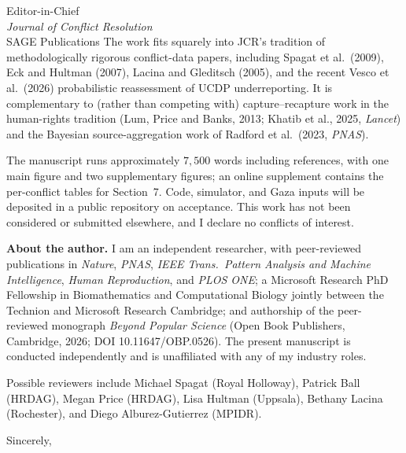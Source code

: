 \documentclass[11pt]{letter}
\begin{document}
\begin{letter}{Editor-in-Chief\\ \emph{Journal of Conflict Resolution}\\ SAGE Publications}
The work fits squarely into JCR's tradition of methodologically rigorous conflict-data papers, including Spagat et al.\ (2009), Eck and Hultman (2007), Lacina and Gleditsch (2005), and the recent Vesco et al.\ (2026) probabilistic reassessment of UCDP underreporting. It is complementary to (rather than competing with) capture--recapture work in the human-rights tradition (Lum, Price and Banks, 2013; Khatib et al., 2025, \emph{Lancet}) and the Bayesian source-aggregation work of Radford et al.\ (2023, \emph{PNAS}).

The manuscript runs approximately $7{,}500$ words including references, with one main figure and two supplementary figures; an online supplement contains the per-conflict tables for Section~7. Code, simulator, and Gaza inputs will be deposited in a public repository on acceptance. This work has not been considered or submitted elsewhere, and I declare no conflicts of interest.

\textbf{About the author.} I am an independent researcher, with peer-reviewed publications in \emph{Nature}, \emph{PNAS}, \emph{IEEE Trans.\ Pattern Analysis and Machine Intelligence}, \emph{Human Reproduction}, and \emph{PLOS ONE}; a Microsoft Research PhD Fellowship in Biomathematics and Computational Biology jointly between the Technion and Microsoft Research Cambridge; and authorship of the peer-reviewed monograph \emph{Beyond Popular Science} (Open Book Publishers, Cambridge, 2026; DOI 10.11647/OBP.0526). The present manuscript is conducted independently and is unaffiliated with any of my industry roles.

Possible reviewers include Michael Spagat (Royal Holloway), Patrick Ball (HRDAG), Megan Price (HRDAG), Lisa Hultman (Uppsala), Bethany Lacina (Rochester), and Diego Alburez-Gutierrez (MPIDR).

\closing{Sincerely,}

\end{letter}
\end{document}
